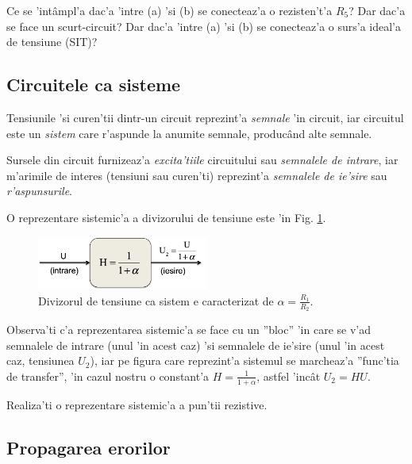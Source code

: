 \begin{exercise}%
Ce se 'int\^ampl'a dac'a 'intre (a) 'si (b) se conecteaz'a o rezisten't'a $R_5$? Dar dac'a se face un scurt-circuit? Dar dac'a 'intre (a) 'si (b) se conecteaz'a o surs'a ideal'a de tensiune (SIT)?
\end{exercise}

\subsection*{Circuitele ca sisteme}\label{subsection:ca_sisteme}

Tensiunile 'si curen'tii dintr-un circuit reprezint'a \textit{semnale} 'in circuit, iar circuitul este un \textit{sistem} care r'aspunde la anumite semnale, produc\^and alte semnale.

Sursele din circuit furnizeaz'a \textit{excita'tiile} circuitului sau \textit{semnalele de intrare}, iar m'arimile de interes (tensiuni sau curen'ti) reprezint'a \textit{semnalele de ie'sire} sau \textit{r'aspunsurile}.

O reprezentare sistemic'a a divizorului de tensiune este 'in Fig. \ref{fig:divizor_tensiune_gol_sistem}.

\begin{figure}
	\centering
		\includegraphics[width=0.5\textwidth]{laborator_01/figuri/divizor_tensiune_gol_sistem}
	\caption{Divizorul de tensiune ca sistem e caracterizat de $\alpha = \frac{R_1}{R_2}$.}
	\label{fig:divizor_tensiune_gol_sistem}
\end{figure}

Observa'ti c'a reprezentarea sistemic'a se face cu un ''bloc'' 'in care se v'ad semnalele de intrare (unul 'in acest caz) 'si semnalele de ie'sire (unul 'in acest caz, tensiunea $U_2$), iar pe figura care reprezint'a sistemul se marcheaz'a ''func'tia de transfer'', 'in cazul nostru o constant'a $H = \frac{1}{1+\alpha}$, astfel 'inc\^at $U_2 = HU$.

\begin{exercise}%
  Realiza'ti o reprezentare sistemic'a a pun'tii rezistive.
\end{exercise}


\subsection*{Propagarea erorilor}

